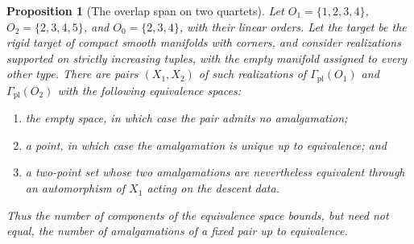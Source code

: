 \documentclass[11pt,letterpaper,twoside]{article}
\theoremstyle{plain}
\newtheorem{proposition}[theorem]{Proposition}
\theoremstyle{definition}
\theoremstyle{remark}
\begin{document}
\begin{proposition}[The overlap span on two quartets]\label{prop:overlap-quartets}
Let \(O_1=\{1,2,3,4\}\), \(O_2=\{2,3,4,5\}\), and \(O_0=\{2,3,4\}\), with their linear orders.  Let the target be the rigid target of compact smooth manifolds with corners, and consider realizations supported on strictly increasing tuples, with the empty manifold assigned to every other type.  There are pairs \((X_1,X_2)\) of such realizations of \(\Gamma_{\mathrm{pl}}(O_1)\) and \(\Gamma_{\mathrm{pl}}(O_2)\) with the following equivalence spaces:
\begin{enumerate}
\item the empty space, in which case the pair admits no amalgamation;
\item a point, in which case the amalgamation is unique up to equivalence; and
\item a two-point set whose two amalgamations are nevertheless equivalent through an automorphism of \(X_1\) acting on the descent data.
\end{enumerate}
Thus the number of components of the equivalence space bounds, but need not equal, the number of amalgamations of a fixed pair up to equivalence.
\end{proposition}
\end{document}

